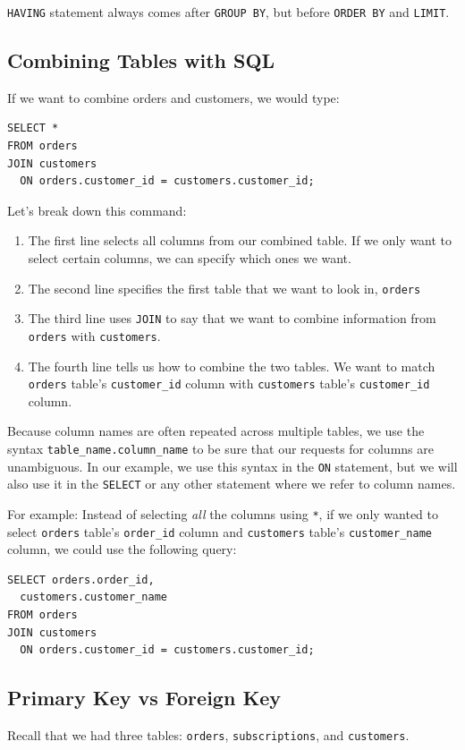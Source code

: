 \documentclass[a4paper, 12pt]{article}
\begin{document}
\verb|HAVING| statement always comes after \verb|GROUP BY|, but before \verb|ORDER BY| and \verb|LIMIT|.

\subsection{Combining Tables with SQL}
If we want to combine orders and customers, we would type:
\begin{verbatim}
SELECT *
FROM orders
JOIN customers
  ON orders.customer_id = customers.customer_id;
\end{verbatim}
Let's break down this command:
\begin{enumerate}
\item The first line selects all columns from our combined table. If we only want to select certain columns, we can specify which ones we want.

\item The second line specifies the first table that we want to look in, \verb|orders|

\item The third line uses \verb|JOIN| to say that we want to combine information from \verb|orders| with \verb|customers|.

\item The fourth line tells us how to combine the two tables. We want to match \verb|orders| table's \verb|customer_id| column with \verb|customers| table's \verb|customer_id| column.

\end{enumerate}
Because column names are often repeated across multiple tables, we use the syntax \verb|table_name.column_name| to be sure that our requests for columns are unambiguous. In our example, we use this syntax in the \verb|ON| statement, but we will also use it in the \verb|SELECT| or any other statement where we refer to column names.

For example: Instead of selecting \textit{all} the columns using \verb|*|, if we only wanted to select \verb|orders| table's \verb|order_id| column and \verb|customers| table's \verb|customer_name| column, we could use the following query:
\begin{verbatim}
SELECT orders.order_id,
  customers.customer_name
FROM orders
JOIN customers
  ON orders.customer_id = customers.customer_id;
\end{verbatim}

\subsection{Primary Key vs Foreign Key}
Recall that we had three tables: \verb|orders|, \verb|subscriptions|, and \verb|customers|.
\end{document}

